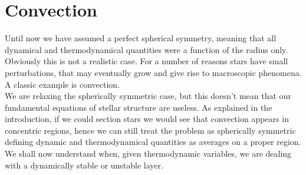 \section{Convection}
Until now we have assumed a perfect spherical symmetry, meaning that all dynamical and thermodynamical quantities were a function of the radius only. Obviously this is not a realistic case. For a number of reasons stars have small perturbations, that may eventually grow and give rise to macroscopic phenomena. A classic example is convection.\\
We are relaxing the spherically symmetric case, but this doesn't mean that our fundamental equations of stellar structure are useless. As explained in the introduction, if we could section stars we would see that convection appears in concentric regions, hence  we can still treat the problem as spherically symmetric defining dynamic and thermodynamical quantities as averages on a proper region. \\
We shall now understand when, given thermodynamic variables, we are dealing with a dynamically stable or unstable layer.


